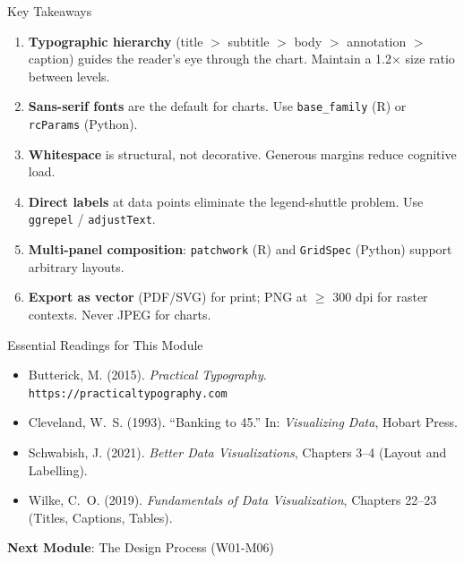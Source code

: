 \documentclass[10pt]{beamer}
\begin{document}
\begin{frame}{Key Takeaways}
  \begin{enumerate}
    \item \textbf{Typographic hierarchy} (title $>$ subtitle $>$ body
          $>$ annotation $>$ caption) guides the reader's eye through
          the chart. Maintain a 1.2$\times$ size ratio between levels.
    \item \textbf{Sans-serif fonts} are the default for charts.
          Use \texttt{base\_family} (R) or \texttt{rcParams} (Python).
    \item \textbf{Whitespace} is structural, not decorative. Generous
          margins reduce cognitive load.
    \item \textbf{Direct labels} at data points eliminate the legend-shuttle
          problem. Use \texttt{ggrepel} / \texttt{adjustText}.
    \item \textbf{Multi-panel composition}: \texttt{patchwork} (R) and
          \texttt{GridSpec} (Python) support arbitrary layouts.
    \item \textbf{Export as vector} (PDF/SVG) for print; PNG at $\geq$ 300
          dpi for raster contexts. Never JPEG for charts.
  \end{enumerate}
\end{frame}

\begin{frame}{Essential Readings for This Module}
  \begin{itemize}
    \item Butterick, M. (2015). \emph{Practical Typography}.
          \texttt{https://practicaltypography.com}
    \item Cleveland, W.~S. (1993). ``Banking to 45\textdegree.''
          In: \emph{Visualizing Data}, Hobart Press.
    \item Schwabish, J. (2021). \emph{Better Data Visualizations},
          Chapters 3--4 (Layout and Labelling).
    \item Wilke, C.~O. (2019). \emph{Fundamentals of Data Visualization},
          Chapters 22--23 (Titles, Captions, Tables).
  \end{itemize}

  \vspace{6pt}
  \textbf{Next Module}: The Design Process (W01-M06)
\end{frame}
\end{document}
